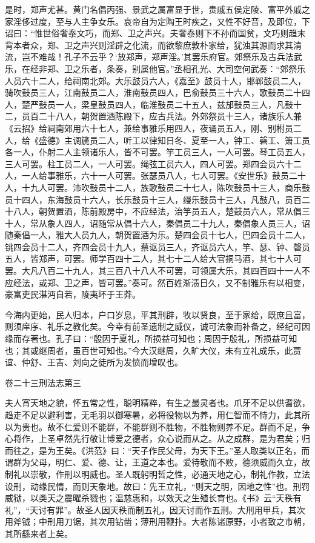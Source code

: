 \documentclass[12pt,UTF8]{ctexbook}
\begin{document}
是时，郑声尤甚。黄门名倡丙强、景武之属富显于世，贵戚五侯定陵、富平外戚之家淫侈过度，至与人主争女乐。哀帝自为定陶王时疾之，又性不好音，及即位，下诏曰：“惟世俗奢泰文巧，而郑、卫之声兴。夫奢泰则下不孙而国贫，文巧则趋末背本者众，郑、卫之声兴则淫辟之化流，而欲黎庶敦朴家给，犹浊其源而求其清流，岂不难哉！孔子不云乎？‘放郑声，郑声淫。’其罢乐府官。郊祭乐及古兵法武乐，在经非郑、卫之乐者，条奏，别属他官。”丞相孔光、大司空何武奏：“郊祭乐人员六十二人，给祠南北郊。大乐鼓员六人，《嘉至》鼓员十人，邯郸鼓员二人，骑吹鼓员三人，江南鼓员二人，淮南鼓员四人，巴俞鼓员三十六人，歌鼓员二十四人，楚严鼓员一人，梁皇鼓员四人，临淮鼓员二十五人，兹邡鼓员三人，凡鼓十二，员百二十八人，朝贺置酒陈殿下，应古兵法。外郊祭员十三人，诸族乐人兼《云招》给祠南郊用六十七人，兼给事雅乐用四人，夜诵员五人，刚、别柎员二人，给《盛德》主调篪员二人，听工以律知日冬、夏至一人，钟工、磬工、箫工员各一人，仆射二人主领诸乐人，皆不可罢。竽工员三人，一人可罢。琴工员五人，三人可罢。柱工员二人，一人可罢。绳弦工员六人，四人可罢。郑四会员六十二人，一人给事雅乐，六十一人可罢。张瑟员八人，七人可罢。《安世乐》鼓员二十人，十九人可罢。沛吹鼓员十二人，族歌鼓员二十七人，陈吹鼓员十三人，商乐鼓员十四人，东海鼓员十六人，长乐鼓员十三人，缦乐鼓员十三人，凡鼓八，员百二十八人，朝贺置酒，陈前殿房中，不应经法，治竽员五人，楚鼓员六人，常从倡三十人，常从象人四人，诏随常从倡十六人，秦倡员二十九人，秦倡象人员三人，诏随秦倡一人，雅大人员九人，朝贺置酒为乐。楚四会员十七人，巴四会员十二人，铫四会员十二人，齐四会员十九人，蔡讴员三人，齐讴员六人，竽、瑟、钟、磬员五人，皆郑声，可罢。师学百四十二人，其七十二人给大官挏马酒，其七十人可罢。大凡八百二十九人，其三百八十八人不可罢，可领属大乐，其四百四十一人不应经法，或郑、卫之声，皆可罢。”奏可。然百姓渐渍日久，又不制雅乐有以相变，豪富吏民湛沔自若，陵夷坏于王莽。



今海内更始，民人归本，户口岁息，平其刑辟，牧以贤良，至于家给，既庶且富，则须庠序、礼乐之教化矣。今幸有前圣遗制之威仪，诚可法象而补备之，经纪可因缘而存著也。孔子曰：“殷因于夏礼，所损益可知也；周因于殷礼，所损益可知也；其或继周者，虽百世可知也。”今大汉继周，久旷大仪，未有立礼成乐，此贾谊、仲舒、王吉、刘向之徒所为发愤而增叹也。





卷二十三刑法志第三



夫人宵天地之貌，怀五常之性，聪明精粹，有生之最灵者也。爪牙不足以供耆欲，趋走不足以避利害，无毛羽以御寒暑，必将役物以为养，用仁智而不恃力，此其所以为贵也。故不仁爱则不能群，不能群则不胜物，不胜物则养不足。群而不足，争心将作，上圣卓然先行敬让博爱之德者，众心说而从之。从之成群，是为君矣；归而往之，是为王矣。《洪范》曰：“天子作民父母，为天下王。”圣人取类以正名，而谓群为父母，明仁、爱、德、让，王道之本也。爱待敬而不败，德须威而久立，故制礼以崇敬，作刑以明威也。圣人既躬明哲之性，必通天地之心，制礼作教，立法设刑，动缘民情，而则天象地。故曰：先王立礼，“则天之明，因地之性”也。刑罚威狱，以类天之震曜杀戮也；温慈惠和，以效天之生殖长育也。《书》云“天秩有礼”，“天讨有罪”。故圣人因天秩而制五礼，因天讨而作五刑。大刑用甲兵，其次用斧钺；中刑用刀锯，其次用钻凿；薄刑用鞭扑。大者陈诸原野，小者致之市朝，其所繇来者上矣。
\end{document}
